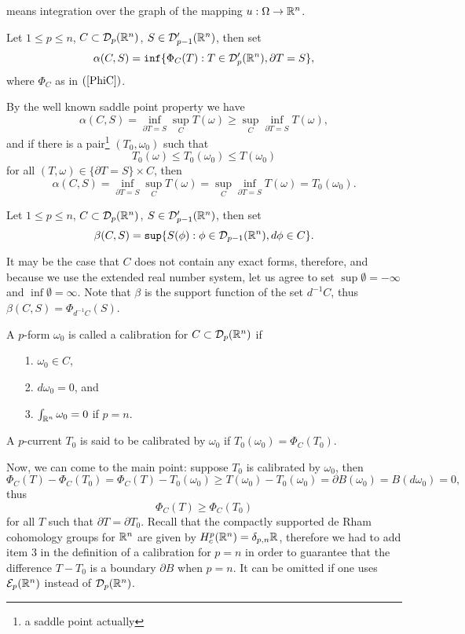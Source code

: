 \documentclass[11pt,a4paper]{article}
\begin{document}
means integration over the graph of the mapping $u:\Omega \rightarrow \mathbb{R}^n$.
\newpage
\begin{definition}
Let $1\leq p\leq n$, $C\subset {{\cal D}}_p(\mathbb{R}^n)$, $S\in  {{\cal D}}'_{p-1}(\mathbb{R}^n)$, then set
  \begin{equation}
    \alpha(C,S)= {\tt inf}\{\Phi_C(T): T\in {{\cal D}}'_p(\mathbb{R}^n), \partial T = S\},
  \end{equation}   
where $\Phi_C$ as in $(\ref{PhiC})$.
\end{definition}
By the well known saddle point property we have
\[
   \alpha(C,S)= \inf_{\partial T=S} \sup_C T(\omega) \geq \sup_C\inf_{\partial T=S} T(\omega),
\]
and if there is a pair\footnote{a saddle point actually}  $(T_0,\omega_0)$ such that
\[
       T_0(\omega) \leq T_0(\omega_0)\leq T(\omega_0)
\]
for all $(T,\omega)\in \{\partial T=S\}\times C$, then
\[
   \alpha(C,S)= \inf_{\partial T=S} \sup_C T(\omega) = 
      \sup_C\inf_{\partial T=S} T(\omega) = T_0(\omega_0).
\]
\begin{definition}
Let $1\leq p\leq n$, $C\subset {{\cal D}}_p(\mathbb{R}^n)$, $S\in  {{\cal D}}'_{p-1}(\mathbb{R}^n)$, then set
  \begin{equation}
    \beta(C,S)= {\tt sup}\{S(\phi): \phi\in {{\cal D}}_{p-1}(\mathbb{R}^n), d\phi\in C \}.
  \end{equation}   
\end{definition}
It may be the case that $C$ does not contain any exact forms, therefore, and because we use the extended real number system, let us agree to set
$\sup \emptyset=-\infty$ and $\inf \emptyset=\infty$. Note that $\beta$ is the support
function of the set $d^{-1}C$, thus $\beta(C,S)=\Phi_{d^{-1}C}(S)$. 
\begin{definition}
 A $p$-form $\omega_0$ is called a calibration for $C\subset {{\cal D}}_p(\mathbb{R}^n)$ if 
  \begin{itemize}
    \item[1.] $\omega_0\in C$,
    \item[2.] $d\omega_0=0$, and
    \item[3.] $\int_{\mathbb{R}^n} \omega_0=0$ if $p=n$.
  \end{itemize}
 A $p$-current $T_0$ is said to be calibrated by $\omega_0$ if $T_0(\omega_0)=\Phi_C(T_0)$.
\end{definition}
Now, we can come to the main point: suppose $T_0$ is calibrated by $\omega_0$, then 
\[
   \Phi_C(T)-\Phi_C(T_0)=\Phi_C(T) - T_0(\omega_0)\geq T(\omega_0) - T_0(\omega_0)
     =\partial B(\omega_0)=B(d\omega_0)=0,
\]
thus
\[
   \Phi_C(T)\geq \Phi_C(T_0)
\]
for all $T$ such that $\partial T=\partial T_0$. Recall that the compactly supported
de Rham cohomology groups for $\mathbb{R}^n$ are given by $H_c^p(\mathbb{R}^n)=\delta_{p,n}{\mathbb{R}}$, 
therefore we had to add item 3 in the definition of a calibration for $p=n$ in order
to guarantee that the difference $T-T_0$ is a boundary $\partial B$ when $p=n$. It can be 
omitted if one uses ${{\cal E}_p}(\mathbb{R}^n)$ instead of ${{\cal D}}_p(\mathbb{R}^n)$.
\end{document}
